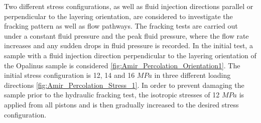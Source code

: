 Two different stress configurations, as well as fluid injection directions parallel or perpendicular to the layering orientation, are considered to investigate the fracking pattern as well as flow pathways. The fracking tests are carried out under a constant fluid pressure and the peak fluid pressure, where the flow rate increases and any sudden drops in fluid pressure is recorded. In the initial test, a sample with a fluid injection direction perpendicular to the layering orientation of the Opalinus sample is considered \ref{fig:Amir_Percolation_Orientation1}. The initial stress configuration is 12, 14 and 16 $MPa$ in three different loading directions \ref{fig:Amir_Percolation_Stress_1}. In order to prevent damaging the sample prior to the hydraulic fracking test, the isotropic stresses of 12 $MPa$ is applied from all pistons and is then gradually increased to the desired stress configuration. 


